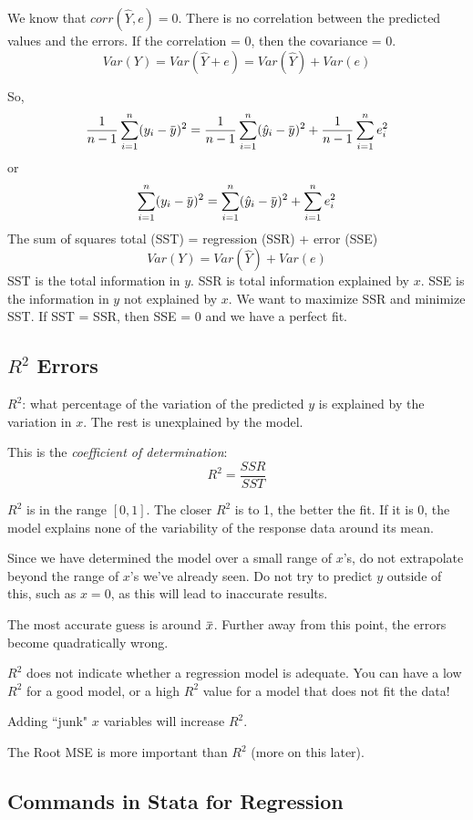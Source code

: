 \documentclass[11pt, oneside]{article}   	%
\newcommand{\overbar}[1]{\mkern 1.5mu\overline{\mkern-1.5mu#1\mkern-1.5mu}\mkern 1.5mu}
\begin{document}
We know that $corr(\hat{Y}, e) = 0$. There is no correlation between the predicted values and the errors. If the correlation = 0, then the covariance = 0.
\[
Var(Y) = Var(\hat{Y} + e)  = Var(\hat{Y}) + Var(e) 
\]

So,
\[
\frac{1}{n-1} \sum\limits_{i=1}^n (y_i - \overbar{y})^2 = \frac{1}{n-1} \sum\limits_{i=1}^n (\hat{y}_i - \overbar{y})^2 + \frac{1}{n-1} \sum\limits_{i=1}^n e_i^2
\]
or
\[
 \sum\limits_{i=1}^n (y_i - \overbar{y})^2 = \sum\limits_{i=1}^n (\hat{y}_i - \overbar{y})^2 +  \sum\limits_{i=1}^n e_i^2
\]
The sum of squares total (SST) = regression (SSR) + error (SSE)
\[
Var(Y) = Var(\hat{Y}) + Var(e)
\]
SST is the total information in $y$. SSR is total information explained by $x$. SSE is the information in $y$ not explained by $x$. We want to maximize SSR and minimize SST. If SST = SSR, then SSE = 0 and we have a perfect fit.

\subsection{$R^2$ Errors}

$R^2$: what percentage of the variation of the predicted $y$  is explained by the variation in $x$. The rest is unexplained by the model.

This is the \textit{coefficient of determination}:
\[
R^2 = \frac{SSR}{SST}
\]

$R^2$ is in the range $[0,1]$. The closer $R^2$ is to 1, the better the fit. If it is 0, the model explains none of the variability of the response data around its mean.

Since we have determined the model over a small range of $x$'s, do not extrapolate beyond the range of $x$'s we've already seen. Do not try to predict $y$ outside of this, such as $x=0$, as this will lead to inaccurate results.

The most accurate guess is around $\overbar{x}$. Further away from this point, the errors become quadratically wrong.

$R^2$ does not indicate whether a regression model is adequate. You can have a low $R^2$ for a good model, or a high $R^2$ value for a model that does not fit the data! 

Adding ``junk" $x$ variables will increase $R^2$.

The Root MSE is more important than $R^2$ (more on this later).

\subsection{Commands in Stata for Regression}
\end{document}
